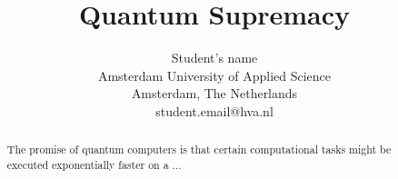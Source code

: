 \documentclass[a4paper, 10pt]{article}
\begin{document}


%
%
%
\title{Quantum Supremacy}
\author{
Student's name \\
Amsterdam University of Applied Science \\
Amsterdam, The Netherlands \\
student.email@hva.nl
}
%

\maketitle                %


%
%
%
\begin{abstract}
The promise of quantum computers is that certain computational tasks might be
executed exponentially faster on a ...
\end{abstract}
%




%
%
%





%


%
%
%
\printbibliography[heading=bibintoc]
%
\end{document}
